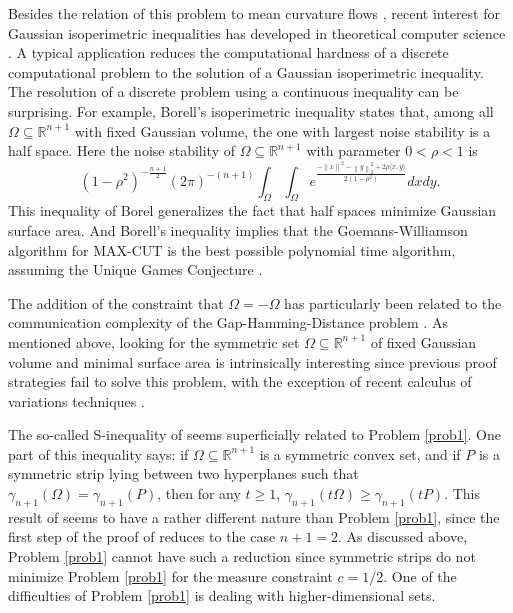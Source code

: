 \documentclass[12pt,reqno]{amsart}
\theoremstyle{definition}
\renewcommand{\subset}{\subseteq}
\newcommand{\vnormt}[1]{\left\|#1\right\|}    %
\newcommand{\R}{\mathbb{R}}
\newcommand{\adimn}{n+1}
\begin{document}
Besides the relation of this problem to mean curvature flows \cite{colding12a,colding15a}, recent interest for Gaussian isoperimetric inequalities has developed in theoretical computer science \cite{khot07,mossel10,isaksson11}.  A typical application reduces the computational hardness of a discrete computational problem to the solution of a Gaussian isoperimetric inequality.  The resolution of a discrete problem using a continuous inequality can be surprising.  For example, Borell's isoperimetric inequality \cite{borell85,mossel12,eldan13} states that, among all $\Omega\subset\R^{\adimn}$ with fixed Gaussian volume, the one with largest noise stability is a half space.  Here the noise stability of $\Omega\subset\R^{\adimn}$ with parameter $0<\rho<1$ is
$$(1-\rho^{2})^{-\frac{\adimn}{2}}(2\pi)^{-(\adimn)}\int_{\Omega}\int_{\Omega}e^{\frac{-\vnormt{x}^{2}-\vnormt{y}_{2}^{2}+2\rho\langle x,y\rangle}{2(1-\rho^{2})}}dxdy.$$
This inequality of Borel generalizes the fact that half spaces minimize Gaussian surface area.  And Borell's inequality implies \cite{khot07} that the Goemans-Williamson algorithm for MAX-CUT \cite{goemans95} is the best possible polynomial time algorithm, assuming the Unique Games Conjecture \cite{khot02}.

The addition of the constraint that $\Omega=-\Omega$ has particularly been related to the communication complexity of the Gap-Hamming-Distance problem \cite{chakrabarti10,sherstov12,vidick13a}.  As mentioned above, looking for the symmetric set $\Omega\subset\R^{\adimn}$ of fixed Gaussian volume and minimal surface area is intrinsically interesting since previous proof strategies fail to solve this problem, with the exception of recent calculus of variations techniques \cite{colding12a,colding12,mcgonagle15,barchiesi16}.

The so-called S-inequality of \cite{latala99} seems superficially related to Problem \ref{prob1}.  One part of this inequality says: if $\Omega\subset\R^{\adimn}$ is a symmetric convex set, and if $P$ is a symmetric strip lying between two hyperplanes such that $\gamma_{\adimn}(\Omega)=\gamma_{\adimn}(P)$, then for any $t\geq1$, $\gamma_{\adimn}(t\Omega)\geq\gamma_{\adimn}(tP)$.  This result of \cite{latala99} seems to have a rather different nature than Problem \ref{prob1}, since the first step of the proof of \cite{latala99} reduces to the case $\adimn=2$.  As discussed above, Problem \ref{prob1} cannot have such a reduction since symmetric strips do not minimize Problem \ref{prob1} for the measure constraint $c=1/2$.  One of the difficulties of Problem \ref{prob1} is dealing with higher-dimensional sets.
\end{document}
